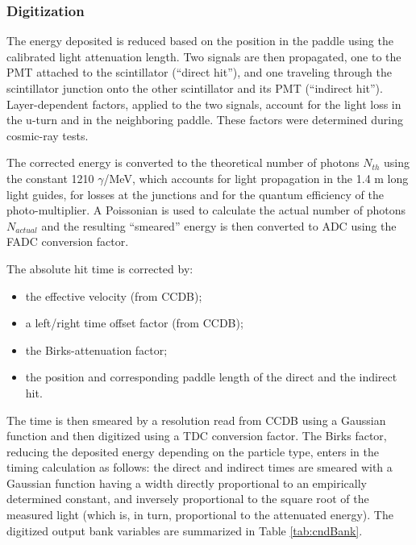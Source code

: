 \subsubsection{Digitization}

The energy deposited is reduced based on the position in the paddle using the calibrated light attenuation length.
Two signals are then propagated, one to the PMT attached to the scintillator (``direct hit''), and one traveling
through the scintillator junction onto the other scintillator and its PMT (``indirect hit'').
Layer-dependent factors, applied to the two  signals, account for the light loss in the u-turn and in the neighboring paddle.
These factors were determined during cosmic-ray tests.

The corrected energy is converted to the theoretical number of photons $N_{th}$ using the constant 1210 $\gamma$/MeV,
which accounts for light propagation in the 1.4 m long light guides, for losses at the junctions and for the
quantum efficiency of the photo-multiplier.
A Poissonian is used to calculate the actual number of photons $N_{actual}$ and the resulting ``smeared'' energy
is then converted to ADC using the FADC conversion factor.

The absolute hit time is corrected by:

\begin{itemize}
	\item the effective velocity (from CCDB);
	\item a left/right time offset factor (from CCDB);
	\item the Birks-attenuation factor;
	\item the position and corresponding paddle length of the direct and the indirect hit.
\end{itemize}

The time is then smeared by a resolution read from CCDB using a Gaussian function and then digitized using a TDC conversion factor.
The Birks factor, reducing the deposited
energy depending on the particle type, enters in the timing calculation as
follows: the direct and indirect times are smeared with a Gaussian
function having a width directly proportional to an empirically determined
constant, and inversely proportional to the square root of the measured
light (which is, in turn, proportional to the attenuated energy).
The digitized output bank variables are summarized in Table \ref{tab:cndBank}.

